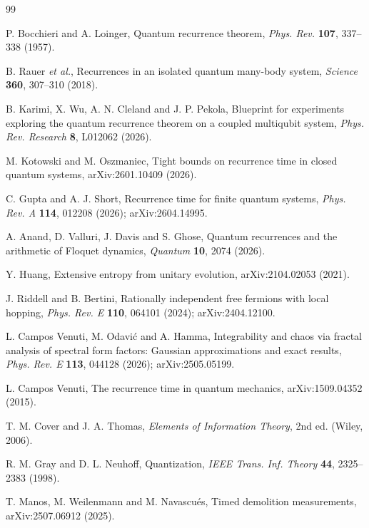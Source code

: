 \documentclass[10pt]{article}
\theoremstyle{definition}
\begin{document}
\begin{thebibliography}{99}

P. Bocchieri and A. Loinger,
Quantum recurrence theorem,
\emph{Phys. Rev.} \textbf{107}, 337--338 (1957).

B. Rauer \emph{et al.},
Recurrences in an isolated quantum many-body system,
\emph{Science} \textbf{360}, 307--310 (2018).

B. Karimi, X. Wu, A. N. Cleland and J. P. Pekola,
Blueprint for experiments exploring the quantum recurrence theorem on a
coupled multiqubit system,
\emph{Phys. Rev. Research} \textbf{8}, L012062 (2026).

M. Kotowski and M. Oszmaniec,
Tight bounds on recurrence time in closed quantum systems,
arXiv:2601.10409 (2026).

C. Gupta and A. J. Short,
Recurrence time for finite quantum systems,
\emph{Phys. Rev. A} \textbf{114}, 012208 (2026);
arXiv:2604.14995.

A. Anand, D. Valluri, J. Davis and S. Ghose,
Quantum recurrences and the arithmetic of Floquet dynamics,
\emph{Quantum} \textbf{10}, 2074 (2026).

Y. Huang,
Extensive entropy from unitary evolution,
arXiv:2104.02053 (2021).

J. Riddell and B. Bertini,
Rationally independent free fermions with local hopping,
\emph{Phys. Rev. E} \textbf{110}, 064101 (2024);
arXiv:2404.12100.

L. Campos Venuti, M. Odavi\'c and A. Hamma,
Integrability and chaos via fractal analysis of spectral form factors:
Gaussian approximations and exact results,
\emph{Phys. Rev. E} \textbf{113}, 044128 (2026);
arXiv:2505.05199.

L. Campos Venuti,
The recurrence time in quantum mechanics,
arXiv:1509.04352 (2015).

T. M. Cover and J. A. Thomas,
\emph{Elements of Information Theory}, 2nd ed. (Wiley, 2006).

R. M. Gray and D. L. Neuhoff,
Quantization,
\emph{IEEE Trans. Inf. Theory} \textbf{44}, 2325--2383 (1998).

T. Manos, M. Weilenmann and M. Navascu\'es,
Timed demolition measurements,
arXiv:2507.06912 (2025).

\end{thebibliography}
\end{document}
